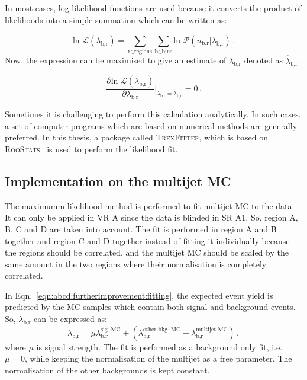 In most cases, log-likelihood functions are used because it converts the product of likelihoods into a simple summation which can be written as:

\begin{equation}
\text{ln }\mathcal{L}(\lambda_{\text{b,r}}) = \sum_{\text{r$\in$regions}}^{}\sum_{\text{b$\in$bins}}^{} \text{ln }\mathcal{P}(n_{\text{b,r}}|\lambda_{\text{b,r}}) \,.
\label{eqn:abcd:furtherimprovement:fitting}
\end{equation}
Now, the expression can be maximised to give an estimate of $\lambda_{\text{b,r}}$ denoted as $\hat{\lambda}_{\text{b,r}}$.

\begin{equation}
	\frac{\partial\text{ln } \mathcal{L}(\lambda_{\text{b,r}})}{\partial \lambda_{\text{b,r}}} \bigg|_{\lambda_{\text{b,r}}=\hat{\lambda}_{\text{b,r}}} = 0 \,.
\end{equation}

Sometimes it is challenging to perform this calculation analytically. In such cases, a set of computer programs which are based on numerical methods are generally preferred. In this thesis, a package called \textsc{TrexFitter}, which is based on \textsc{RooStats}~\cite{roostats} is used to perform the likelihood fit.
\subsection{Implementation on the multijet MC}
\label{sec:abcd:furtherimprovement:scaledcorr}
The maximumm likelihood method is performed to fit multijet MC to the data. It can only be applied in VR A since the data is blinded in SR A1. So, region A, B, C and D are taken into account. The fit is performed in region A and B together and region C and D together instead of fitting it individually because the regions should be correlated, and the multijet MC should be scaled by the same amount in the two regions where their normalisation is completely correlated.

In Eqn.\ \ref{eqn:abcd:furtherimprovement:fitting}, the expected event yield is predicted by the MC samples which contain both signal and background events. So, $\lambda_{\text{b,r}}$ can be expressed as:
\begin{equation}
	\lambda_{\text{b,r}} = \mu\lambda_{\text{b,r}}^{\text{sig. MC}} + (\lambda_{\text{b,r}}^{\text{other bkg. MC}} + \lambda_{\text{b,r}}^{\text{multijet MC}} ) \,,
\end{equation}
where $\mu$ is signal strength. The fit is performed as a background only fit, i.e.\ $\mu = 0$, while keeping the normalisation of the multijet as a free parameter. The normalisation of the other backgrounds is kept constant.

